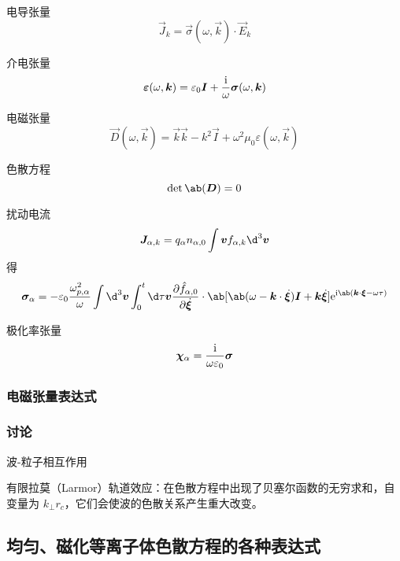电导张量
\begin{equation}
\vec{J}_k = \vec{\sigma}(\omega, \vec{k}) \cdot \vec{E}_k
\end{equation}

介电张量
\begin{equation}
\bm{\varepsilon}(\omega, \bm{k})
= \varepsilon_0 \bm{I}
+ \frac{\mathrm{i}}{\omega} \bm{\sigma}(\omega, \bm{k})
\end{equation}

电磁张量
\begin{equation}
\vec{D}(\omega, \vec{k})
= \vec{k}\vec{k} - k^2 \vec{I}
+ \omega^2 \mu_0 \varepsilon(\omega, \vec{k})
\end{equation}

色散方程
\begin{equation}
\det\ab(\vec{D}) = 0
\end{equation}

扰动电流
\begin{equation}
\vec{J}_{\alpha,k} = q_\alpha n_{\alpha,0}
\int \vec{v} f_{\alpha,k} \d^3\vec{v}
\end{equation}
得
\begin{equation}
\vec{\sigma}_\alpha = - \varepsilon_0 \frac{\omega_{p,\alpha}^2}{\omega}
\int \d^3\vec{v} \int_0^{t} \d\tau
\vec{v} \pdv{\hat{f}_{\alpha,0}}{\dot{\vec{\xi}}} \cdot \ab[
    \ab(\omega - \vec{k}\cdot\dot{\vec{\xi}}) \vec{I}
    + \vec{k} \dot{\vec{\xi}}
] \eu^{\im \ab(\vec{k} \cdot \vec{\xi} - \omega \tau)}
\end{equation}

极化率张量
\begin{equation}
\bm{\chi}_\alpha = \frac{\mathrm{i}}{\omega \varepsilon_0} \bm{\sigma}
\end{equation}

\subsubsection{电磁张量表达式}

\subsubsection{讨论}

波-粒子相互作用

有限拉莫（Larmor）轨道效应：在色散方程中出现了贝塞尔函数的无穷求和，自变量为 $k_\perp r_c$，它们会使波的色散关系产生重大改变。


\subsection{均匀、磁化等离子体色散方程的各种表达式}

